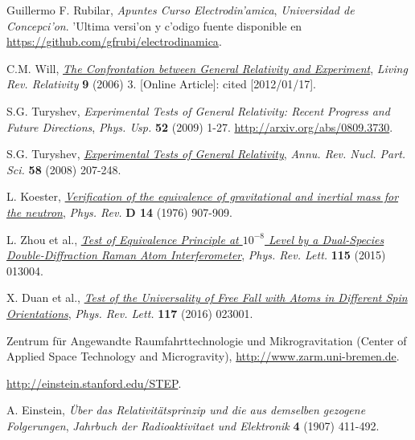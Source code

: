 \begin{thebibliography}{99}


Guillermo F. Rubilar,  \textit{Apuntes Curso Electrodin'amica},  \textsl{
Universidad de Concepci'on}. 'Ultima versi'on y c'odigo fuente disponible en \url{https://github.com/gfrubi/electrodinamica}.

 C.M. Will, \href{http://www.livingreviews.org/lrr-2006-3} \textit{The Confrontation between General Relativity and Experiment},   \textsl{Living Rev. Relativity}   \textbf{9} (2006) 3. [Online Article]: cited [2012/01/17].

 S.G. Turyshev,  \textit{Experimental Tests of General Relativity: Recent Progress and Future Directions},   \textsl{Phys. Usp.}   \textbf{52} (2009) 1-27. \url{http://arxiv.org/abs/0809.3730}.

 S.G. Turyshev, \href{http://www.annualreviews.org/doi/abs/10.1146/annurev.nucl.58.020807.111839} \textit{Experimental Tests of General Relativity},   \textsl{Annu. Rev. Nucl. Part. Sci.}   \textbf{58} (2008) 207-248. 

 L. Koester, \href{http://dx.doi.org/10.1103/PhysRevD.14.907} \textit{Verification of the equivalence of gravitational and inertial mass for the neutron},   \textsl{Phys. Rev.}   \textbf{D 14} (1976) 907-909.

 L. Zhou et al., \href{http://dx.doi.org/10.1103/PhysRevLett.115.013004} \textit{Test of Equivalence Principle at $10^{-8}$ Level by a Dual-Species Double-Diffraction Raman
Atom Interferometer},   \textsl{Phys. Rev. Lett.}   \textbf{115} (2015) 013004.

 X. Duan et al., \href{http://dx.doi.org/10.1103/PhysRevLett.117.023001} \textit{Test of the Universality of Free Fall with Atoms in Different Spin Orientations},   \textsl{Phys. Rev. Lett.}   \textbf{117} (2016) 023001. 

 Zentrum f\"ur Angewandte Raumfahrttechnologie und Mikrogravitation (Center of Applied Space Technology and Microgravity), \url{http://www.zarm.uni-bremen.de}.

 \url{http://einstein.stanford.edu/STEP}.

 A. Einstein,  \textit{\"Uber das Relativit\"atsprinzip und die aus demselben gezogene Folgerungen},   \textsl{Jahrbuch der Radioaktivitaet und Elektronik}   \textbf{4} (1907) 411-492.


\end{thebibliography}
